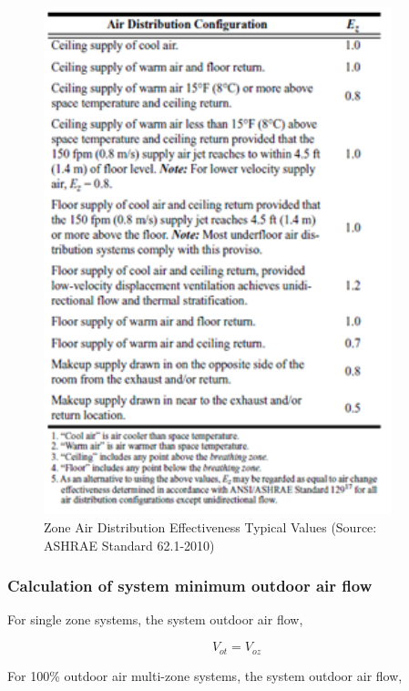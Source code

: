 \begin{figure}[hbtp] %
\centering
\includegraphics[width=0.9\textwidth, height=0.9\textheight, keepaspectratio=true]{media/image4716.png}
\caption{Zone Air Distribution Effectiveness Typical Values (Source: ASHRAE Standard 62.1-2010) \protect \label{fig:zone-air-distribution-effectiveness-typical}}
\end{figure}

\subsubsection{Calculation of system minimum outdoor air flow}\label{calculation-of-system-minimum-outdoor-air-flow}

For single zone systems, the system outdoor air flow,

\begin{equation}
{V_{ot}} = {V_{oz}}
\end{equation}

For 100\% outdoor air multi-zone systems, the system outdoor air flow,

